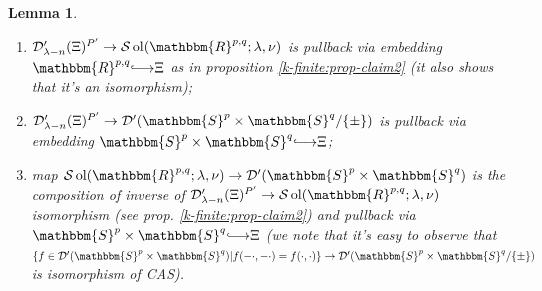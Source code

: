 \documentclass{article}
\newcommand{\longhookrightarrow}{{\lhook\joinrel\relbar\joinrel\rightarrow}}
\newcommand{\tmop}[1]{\ensuremath{\operatorname{#1}}}
\newtheorem{lemma}{Lemma}
\begin{document}
\begin{lemma}
\begin{enumerate}
    \item $\mathcal{D}'_{\lambda - n} (\Xi)^{P'} \rightarrow \mathcal{S}
    \tmop{ol} (\mathbbm{R}^{p, q} ; \lambda, \nu)$ is pullback via embedding
    $\mathbbm{R}^{p, q} \longhookrightarrow \Xi$ as in proposition
    \ref{k-finite:prop-claim2} (it also shows that it's an isomorphism);
    
    \item $\mathcal{D}'_{\lambda - n} (\Xi)^{P'} \rightarrow \mathcal{D}' 
    (\mathbbm{S}^p \times \mathbbm{S}^q / \{ \pm \})$ is pullback via
    embedding $\mathbbm{S}^p \times \mathbbm{S}^q \longhookrightarrow \Xi$;
    
    \item map $\mathcal{S} \tmop{ol} (\mathbbm{R}^{p, q} ; \lambda, \nu)
    \rightarrow \mathcal{D}' (\mathbbm{S}^p \times \mathbbm{S}^q)$ is the
    composition of inverse of $\mathcal{D}'_{\lambda - n} (\Xi)^{P'}
    \rightarrow \mathcal{S} \tmop{ol} (\mathbbm{R}^{p, q} ; \lambda, \nu)$
    isomorphism (see prop. \ref{k-finite:prop-claim2}) and pullback via
    $\mathbbm{S}^p \times \mathbbm{S}^q \longhookrightarrow \Xi$ (we note that
    it's easy to observe that $\{ f \in \mathcal{D}' (\mathbbm{S}^p \times
    \mathbbm{S}^q) | f (- \cdot, - \cdot) = f (\cdot, \cdot) \} \rightarrow
    \mathcal{D}' (\mathbbm{S}^p \times \mathbbm{S}^q / \{ \pm \})$ is
    isomorphism of CAS).
  \end{enumerate}
\end{lemma}
\end{document}

